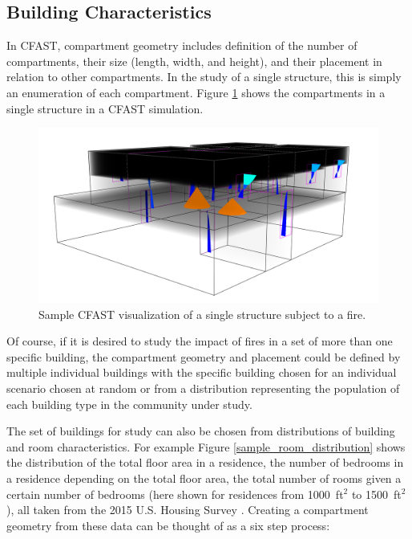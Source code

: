 \documentclass[12pt,twoside]{book}
\begin{document}
\subsection{Building Characteristics}

In CFAST, compartment geometry includes definition of the number of compartments, their size (length, width, and height), and their placement in relation to other compartments. In the study of a single structure, this is simply an enumeration of each compartment. Figure \ref{sample_visualization} shows the compartments in a single structure in a CFAST simulation.

\begin{figure}[h!]
\centering
\includegraphics[width=4.5in]{FIGURES/Sample_Visualization.png}
\caption{Sample CFAST visualization of a single structure subject to a fire.}
\label{sample_visualization}
\end{figure}

Of course, if it is desired to study the impact of fires in a set of more than one specific building, the compartment geometry and placement could be defined by multiple individual buildings with the specific building chosen for an individual scenario chosen at random or from a distribution representing the population of each building type in the community under study.

The set of buildings for study can also be chosen from distributions of building and room characteristics. For example Figure \ref{sample_room_distribution} shows the distribution of the total floor area in a residence, the number of bedrooms in a residence depending on the total floor area, the total number of rooms given a certain number of bedrooms (here shown for residences from 1000~ft$^2$ to 1500~ft$^2$), all taken from the 2015 U.S. Housing Survey \cite{AHS2015}. Creating a compartment geometry from these data can be thought of as a six step process:
\end{document}
